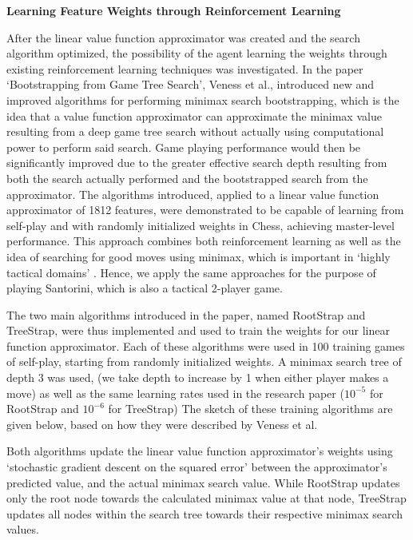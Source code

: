 \documentclass[a4paper,12pt,table]{article}
\begin{document}
\textbf{Learning Feature Weights through Reinforcement Learning}
\newline

After the linear value function approximator was created and the search algorithm optimized, the possibility of the agent learning the weights through existing reinforcement learning techniques was investigated. In the paper ‘Bootstrapping from Game Tree Search’, Veness et al., introduced new and improved algorithms for performing minimax search bootstrapping, which is the idea that a value function approximator can approximate the minimax value resulting from a deep game tree search without actually using computational power to perform said search. Game playing performance would then be significantly improved due to the greater effective search depth resulting from both the search actually performed and the bootstrapped search from the approximator. The algorithms introduced, applied to a linear value function approximator of 1812 features, were demonstrated to be capable of learning from self-play and with randomly initialized weights in Chess, achieving master-level performance. \cite{Bootstrapping from Game Tree Search} This approach combines both reinforcement learning as well as the idea of searching for good moves using minimax, which is important in ‘highly tactical domains’ \cite{Bootstrapping from Game Tree Search}. Hence, we apply the same approaches for the purpose of playing Santorini, which is also a tactical 2-player game. \par

The two main algorithms introduced in the paper, named RootStrap and TreeStrap, were thus implemented and used to train the weights for our linear function approximator. Each of these algorithms were used in 100 training games of self-play, starting from randomly initialized weights. A minimax search tree of depth 3 was used, (we take depth to increase by 1 when either player makes a move) as well as the same learning rates used in the research paper ($10^{-5}$ for RootStrap and $10^{-6}$ for TreeStrap) The sketch of these training algorithms are given below, based on how they were described by Veness et al. \par

Both algorithms update the linear value function approximator’s weights using ‘stochastic gradient descent on the squared error’ between the approximator’s predicted value, and the actual minimax search value. While RootStrap updates only the root node towards the calculated minimax value at that node, TreeStrap updates all nodes within the search tree towards their respective minimax search values. \par
\end{document}

